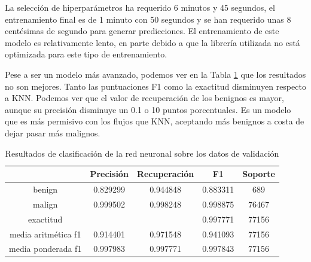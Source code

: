 La selección de hiperparámetros ha requerido 6 minutos y 45 segundos, el entrenamiento final es de 1 minuto con 50 segundos y se han requerido unas 8 centésimas de segundo para generar predicciones. El entrenamiento de este modelo es relativamente lento, en parte debido a que la librería utilizada no está optimizada para este tipo de entrenamiento.

Pese a ser un modelo más avanzado, podemos ver en la Tabla \ref{table:nnresults} que los resultados no son mejores. Tanto las puntuaciones F1 como la exactitud disminuyen respecto a KNN. Podemos ver que el valor de recuperación de los benignos es mayor, aunque su precisión disminuye un 0.1 o 10 puntos porcentuales. Es un modelo que es más permisivo con los flujos que KNN, aceptando más benignos a costa de dejar pasar más malignos.

\begin{table}[H]
    \begin{center}
        \begin{tabular}{|c | c c c | c |} 
            \hline
            & \textbf{Precisión} & \textbf{Recuperación} & \textbf{F1}  & \textbf{Soporte} \\
            \hline
            benign               & 0.829299 & 0.944848 & 0.883311  &   689 \\
            malign               & 0.999502 & 0.998248 & 0.998875  & 76467 \\
            \hline
            exactitud            &          &          & 0.997771  & 77156 \\
            media aritmética f1  & 0.914401 & 0.971548 & 0.941093  & 77156 \\
            media ponderada f1   & 0.997983 & 0.997771 & 0.997843  & 77156 \\
            \hline
        \end{tabular}
    \end{center}
    \caption{Resultados de clasificación de la red neuronal sobre los datos de validación}
    \label{table:nnresults}
\end{table}

